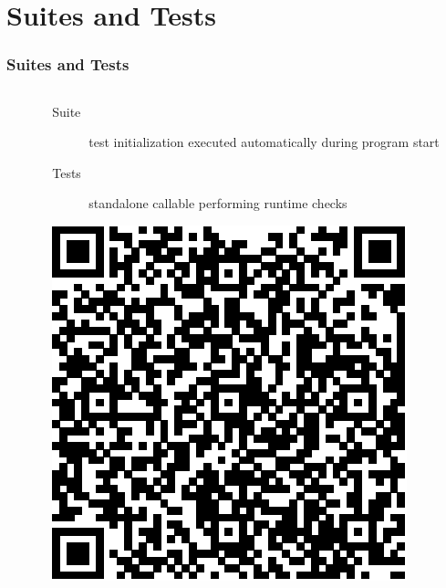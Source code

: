\documentclass[10pt,aspectratio=169,utf8]{beamer}
\begin{document}
\section{Suites and Tests}
\begin{frame}
 \frametitle{Suites and Tests}

 \begin{columns}[onlytextwidth]
  \begin{column}{.45\textwidth}
    \begin{overlayarea}{\textwidth}{.9\textheight}
    \end{overlayarea}
  \end{column}

  \begin{column}{.55\textwidth}
    \begin{description}
      \item[Suite] test initialization executed automatically during program start
      \item[Tests] standalone callable performing runtime checks
    \end{description}

    \vspace{10pt}
    \begin{flushright}
      \includegraphics[width=.6\textwidth]{img/qr}
    \end{flushright}
  \end{column}
 \end{columns}

\end{frame}
\end{document}
